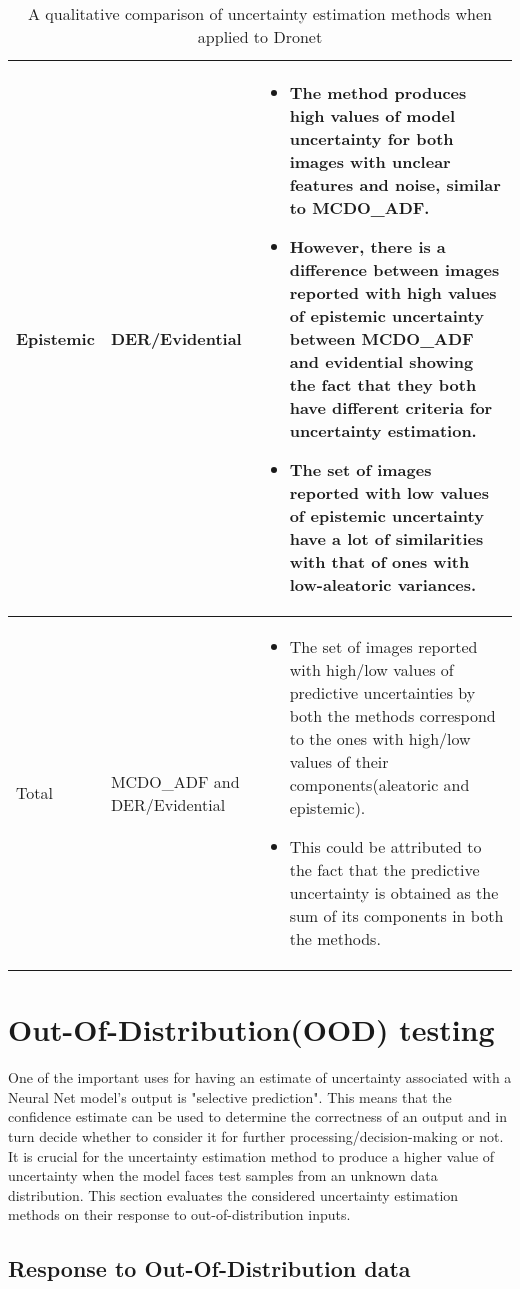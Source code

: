 \begin{table}[h!]
\begin{tabular}[ht]{|p{1.5cm}|p{2.3cm}|p{13.8cm}|}
\hline
Epistemic&DER/Evidential&\begin{itemize}\item The method produces high values of model uncertainty for both images with unclear features and noise, similar to MCDO\_ADF.\item However, there is a difference between images reported with high values of epistemic uncertainty between MCDO\_ADF and evidential showing the fact that they both have different criteria for uncertainty estimation.\item The set of images reported with low values of epistemic uncertainty have a lot of similarities with that of ones with low-aleatoric variances.\end{itemize}\\
\hline
Total& MCDO\_ADF and DER/Evidential&\begin{itemize}\item The set of images reported with high/low values of predictive uncertainties by both the methods correspond to the ones with high/low values of their components(aleatoric and epistemic).\item This could be attributed to the fact that the predictive uncertainty is obtained as the sum of its components in both the methods.\end{itemize}\\
\hline

\end{tabular}
\caption{A qualitative comparison of uncertainty estimation methods when applied to Dronet}
\label{tab_qualit_compare}
\end{table}


\section{Out-Of-Distribution(OOD) testing}
One of the important uses for having an estimate of uncertainty associated with a Neural Net model's output is "selective prediction". This means that the confidence estimate can be used to determine the correctness of an output and in turn decide whether to consider it for further processing/decision-making or not. It is crucial for the uncertainty estimation method to produce a higher value of uncertainty when the model faces test samples from an unknown data distribution. This section evaluates the considered uncertainty estimation methods on their response to out-of-distribution inputs.
\subsection {Response to Out-Of-Distribution data}
